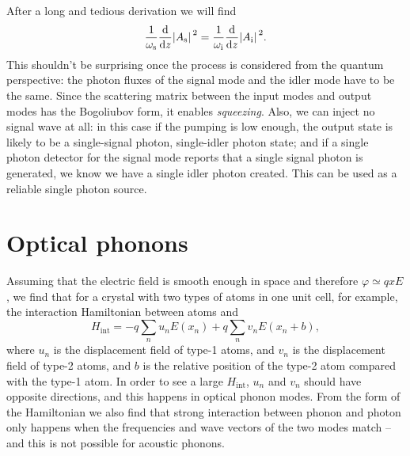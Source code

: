 \documentclass[hyperref, a4paper]{article}
\begin{document}
After a long and tedious derivation we will find 
\begin{equation}
    \frac{1}{\omega_{\text{s}}} \dv{z} \abs*{A_\text{s}}^2 = 
    \frac{1}{\omega_{\text{i}}} \dv{z} \abs*{A_\text{i}}^2 . 
\end{equation}
This shouldn't be surprising once the process is considered from the quantum perspective:
the photon fluxes of the signal mode and the idler mode 
have to be the same.
Since the scattering matrix between the input modes and output modes 
has the Bogoliubov form, it enables \emph{squeezing}.
Also, we can inject no signal wave at all:
in this case if the pumping is low enough, 
the output state is likely to be a 
single-signal photon, single-idler photon state; 
and if a single photon detector for the signal mode reports 
that a single signal photon is generated, 
we know we have a single idler photon created.
This can be used as a reliable single photon source.

\section{Optical phonons}

Assuming that the electric field is smooth enough in space 
and therefore $\varphi \simeq q x E$, 
we find that for a crystal with two types of atoms in one unit cell, for example,
the interaction Hamiltonian between atoms and 
\begin{equation}
    H_{\text{int}} = - q \sum_n u_n E(x_n) 
    + q \sum_n v_n E(x_n + b),
\end{equation}
where $u_n$ is the displacement field of type-1 atoms, 
and $v_n$ is the displacement field of type-2 atoms,
and $b$ is the relative position of the type-2 atom 
compared with the type-1 atom.
In order to see a large $H_{\text{int}}$, 
$u_n$ and $v_n$ should have opposite directions, 
and this happens in optical phonon modes.
From the form of the Hamiltonian we also find that 
strong interaction between phonon and photon only happens 
when the frequencies and wave vectors of the two modes match -- 
and this is not possible for acoustic phonons.
\end{document}
